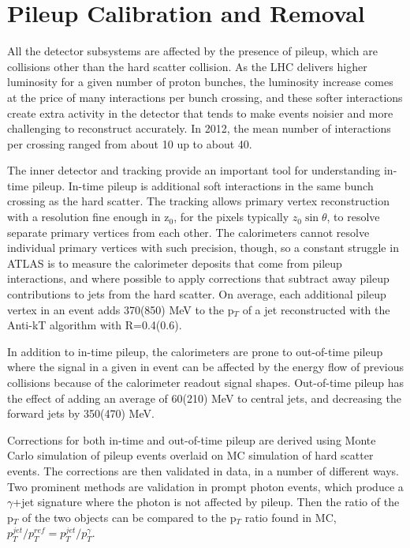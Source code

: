 
\section{Pileup Calibration and Removal}
\label{sec:pileup}
All the detector subsystems are affected by the presence of pileup, which are collisions other than the hard scatter collision.  As the LHC delivers higher luminosity for a given number of proton bunches, the luminosity increase comes at the price of many interactions per bunch crossing, and these softer interactions create extra activity in the detector that tends to make events noisier and more challenging to reconstruct accurately.  In 2012, the mean number of interactions per crossing ranged from about 10 up to about 40.  

The inner detector and tracking provide an important tool for understanding in-time pileup.  In-time pileup is additional soft interactions in the same bunch crossing as the hard scatter.  The tracking allows primary vertex reconstruction with a resolution fine enough in z$_0$, for the pixels typically $z_0\sin\theta$, to resolve separate primary vertices from each other.   The calorimeters cannot resolve individual primary vertices with such precision, though, so a constant struggle in ATLAS is to measure the calorimeter deposits that come from pileup interactions, and where possible to apply corrections that subtract away pileup contributions to jets from the hard scatter.  On average, each additional pileup vertex in an event adds 370(850) MeV to the p$_T$ of a jet reconstructed with the Anti-kT algorithm with R=0.4(0.6).

In addition to in-time pileup, the calorimeters are prone to out-of-time pileup where the signal in a given in event can be affected by the energy flow of previous collisions because of the calorimeter readout signal shapes.  Out-of-time pileup has the effect of adding an average of 60(210) MeV to central jets, and decreasing the forward jets by 350(470) MeV.  

Corrections for both in-time and out-of-time pileup are derived using Monte Carlo simulation of pileup events overlaid on MC simulation of hard scatter events.  The corrections are then validated in data, in a number of different ways.  Two prominent methods are validation in prompt photon events, which produce a $\gamma$+jet signature where the photon is not affected by pileup.  Then the ratio of the p$_T$ of the two objects can be compared to the p$_T$ ratio found in MC, $p^{jet}_T/p^{ref}_T = p^{jet}_T/p^{\gamma}_T$.


